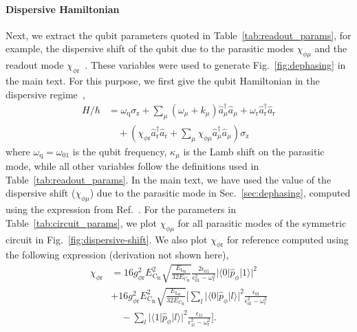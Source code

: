 \documentclass[%
reprint,
superscriptaddress,
 amsmath,amssymb,
 aps,
 prx,
longbibliography,
floatfix,
]{revtex4-2}
\begin{document}
\paragraph{Dispersive Hamiltonian}\label{app:dispersive} 
Next, we extract the qubit parameters quoted in Table~\ref{tab:readout_params}, for example, the dispersive shift of the qubit due to the parasitic modes $\chi_{\phi\mu}$ and the readout mode $\chi_{\phi \textrm{r}}$~\cite{viola2015collective}. These variables were used to generate Fig.~\ref{fig:dephasing} in the main text. For this purpose, we first give the qubit Hamiltonian in the dispersive regime~\cite{viola2015collective},
\begin{align}
    H/\hbar&=\omega_\textrm{q}\sigma_\textrm{z}+\sum_{\mu}(\omega_\mu+k_\mu) \hat a_\mu^\dagger \hat a_\mu
    +\omega_\textrm{r} \hat a_\textrm{r}^\dagger \hat a_\textrm{r}\nonumber\\ &\quad +(\chi_{\phi\textrm{r}} \hat a_\textrm{r}^\dagger \hat a_\textrm{r}
    +\sum_{\mu}\chi_{\phi\mu}\hat a_\mu^\dagger \hat a_\mu)\sigma_\textrm{z}\label{eq:dispersive}
\end{align}
where $\omega_\textrm{q}=\omega_{01}$ is the qubit frequency, $\kappa_\mu$ is the Lamb shift on the parasitic mode, while all other variables follow the definitions used in Table~\ref{tab:readout_params}. In the main text, we have used the value of the dispersive shift ($\chi_{\phi\mu}$) due to the parasitic mode in Sec.~\ref{sec:dephasing}, computed using the expression from Ref.~\cite{viola2015collective}. For the parameters in Table~\ref{tab:circuit_params}, we plot $\chi_{\phi\mu}$ for all parasitic modes of the symmetric circuit in Fig.~\ref{fig:dispersive-shift}. We also plot $\chi_{\phi \textrm{r}}$ for reference computed using the following expression (derivation not shown here),
\begin{align}  
\chi_{\phi \textrm{r}}&=16g_{\phi\textrm{r}}^2E_{\textrm{C}_\textrm{R}}^2\sqrt{\frac{E_{\textrm{L}_\textrm{R}}}{32E_{\textrm{C}_\textrm{R}}}}\frac{2\epsilon_{01}}{\epsilon_{01}^2-\omega_\textrm{r}^2}|\langle 0|\hat p_\phi|1 \rangle|^2\nonumber\\
   &+16g_{\phi\textrm{r}}^2E_{\textrm{C}_\textrm{R}}^2\sqrt{\frac{E_{\textrm{L}_\textrm{R}}}{32E_{\textrm{C}_\textrm{R}}}}\Bigg[\sum_l|\langle 0|\hat p_\phi|l \rangle|^2\frac{\epsilon_{0l}}{\epsilon_{0l}^2-\omega_\textrm{r}^2}\nonumber\\&\quad-\sum_l|\langle 1|\hat p_\phi|l \rangle|^2\frac{\epsilon_{1l}}{\epsilon_{1l}^2-\omega_\textrm{r}^2}\Bigg].\label{eq:qubit-readout-shift}
\end{align}
\end{document}
